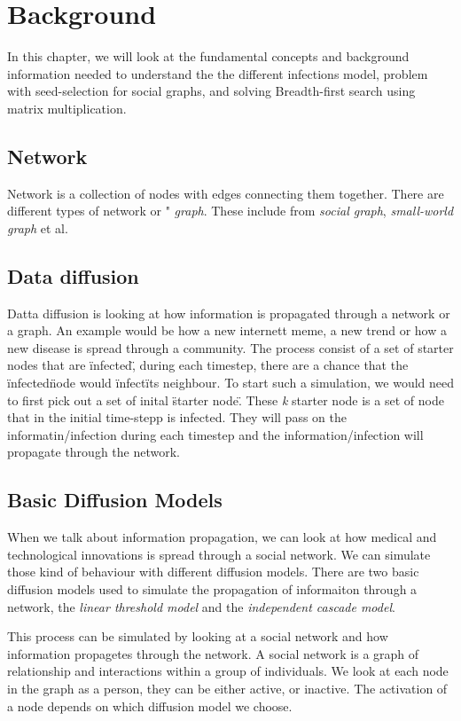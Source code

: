\chapter{Background} 

In this chapter, we will look at the fundamental concepts and background information needed to understand the the different infections model, problem with seed-selection for social graphs, and solving Breadth-first search using matrix multiplication.

\section{Network}
Network is a collection of nodes with edges connecting them together\cite{TheStrucandcomplex}. There are different types of network or " {\it graph}. These include from {\it social graph}, {\it small-world graph} et al. 

\section{Data diffusion}
Datta diffusion is looking at how information is propagated through a network or a graph. An example would be how a new internett meme, a new trend or how a new disease is spread through a community. The process consist of a set of starter nodes that are \"infected\", during each timestep, there are a chance that the \"infected\" node would \"infect\" its neighbour. To start such a simulation, we would need to first pick out a set of inital \"starter node\". These {\it k} starter node is a set of node that in the initial time-stepp is infected. They will pass on the informatin/infection during each timestep and the information/infection will propagate through the network.

\section{Basic Diffusion Models}
When we talk about information propagation, we can look at how medical and technological innovations is spread through a social network. We can simulate those kind of behaviour with different diffusion models. There are two basic diffusion models used to simulate the propagation of informaiton through a network\cite{kempe}, the {\it linear threshold model} and the {\it independent cascade model}\cite{kempe}.

This process can be simulated by looking at a social network and how information propagetes through the network. A social network is a graph of relationship and interactions within a group of individuals. 
We look at each node in the graph as a person, they can be either active, or inactive. The activation of a node depends on which diffusion model we choose.

